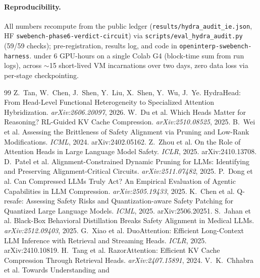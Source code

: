 \documentclass[11pt]{article}
\begin{document}
\paragraph{Reproducibility.} All numbers recompute from the public ledger
(\texttt{results/hydra\_audit\_ie.json}, HF \texttt{swebench-phase6-verdict-circuit}) via
\texttt{scripts/eval\_hydra\_audit.py} (59/59 checks); pre-registration, results log, and code in
\texttt{openinterp-swebench-harness}. under 6 GPU-hours on a single Colab G4 (block-time sum from run logs), across $\sim$15
short-lived VM incarnations over two days, zero data loss via per-stage checkpointing.

\begin{thebibliography}{99}
 Z.~Tan, W.~Chen, J.~Shen, Y.~Liu, X.~Shen, Y.~Wu, J.~Ye.
HydraHead: From Head-Level Functional Heterogeneity to Specialized Attention Hybridization.
\emph{arXiv:2606.20097}, 2026.
 W.~Du et al. Which Heads Matter for Reasoning? RL-Guided KV Cache
Compression. \emph{arXiv:2510.08525}, 2025.
 B.~Wei et al. Assessing the Brittleness of Safety Alignment
via Pruning and Low-Rank Modifications. \emph{ICML}, 2024. arXiv:2402.05162.
 Z.~Zhou et al. On the Role of Attention Heads in Large
Language Model Safety. \emph{ICLR}, 2025. arXiv:2410.13708.
 D.~Patel et al. Alignment-Constrained Dynamic Pruning for LLMs:
Identifying and Preserving Alignment-Critical Circuits. \emph{arXiv:2511.07482}, 2025.
 P.~Dong et al. Can Compressed LLMs Truly Act? An Empirical
Evaluation of Agentic Capabilities in LLM Compression. \emph{arXiv:2505.19433}, 2025.
 K.~Chen et al. Q-resafe: Assessing Safety Risks and
Quantization-aware Safety Patching for Quantized Large Language Models. \emph{ICML}, 2025.
arXiv:2506.20251.
 S.~Jahan et al. Black-Box Behavioral Distillation
Breaks Safety Alignment in Medical LLMs. \emph{arXiv:2512.09403}, 2025.
 G.~Xiao et al. DuoAttention: Efficient Long-Context LLM Inference
with Retrieval and Streaming Heads. \emph{ICLR}, 2025. arXiv:2410.10819.
 H.~Tang et al. RazorAttention: Efficient KV Cache Compression
Through Retrieval Heads. \emph{arXiv:2407.15891}, 2024.
 V.~K.~Chhabra et al. Towards Understanding and

\end{thebibliography}
\end{document}
